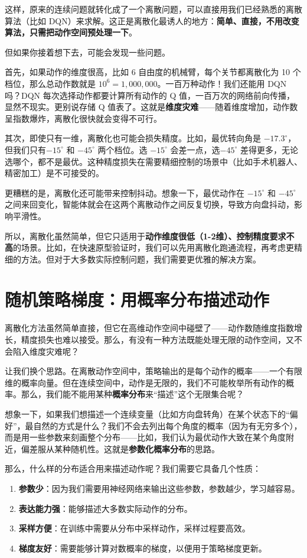 \documentclass[lang=cn,zihao=-4,a4paper,fontset=windows]{beautybook}
\begin{document}
这样，原来的连续问题就转化成了一个离散问题，可以直接用我们已经熟悉的离散算法（比如 DQN）来求解。这正是离散化最诱人的地方：\textbf{简单、直接，不用改变算法，只需把动作空间预处理一下}。

但如果你接着想下去，可能会发现一些问题。

首先，如果动作的维度很高，比如 6 自由度的机械臂，每个关节都离散化为 10 个档位，那么总动作数就是 \(10^6 = 1,000,000\)。一百万种动作！我们还能用 DQN 吗？DQN 每次选择动作都要计算所有动作的 Q 值，一百万次的网络前向传播，显然不现实。更别说存储 Q 值表了。这就是\textbf{维度灾难}——随着维度增加，动作数呈指数爆炸，离散化很快就会变得不可行。

其次，即使只有一维，离散化也可能会损失精度。比如，最优转向角是 $-17.3^\circ$，但我们只有$-15^\circ$ 和 $-45^\circ$ 两个档位。选 $-15^\circ$ 会差一点，选$ -45^\circ$ 差得更多，无论选哪个，都不是最优。这种精度损失在需要精细控制的场景中（比如手术机器人、精密加工）是不可接受的。

更糟糕的是，离散化还可能带来控制抖动。想象一下，最优动作在 $-15^\circ$ 和 $-45^\circ$ 之间来回变化，智能体就会在这两个离散动作之间反复切换，导致方向盘抖动，影响平滑性。

所以，离散化虽然简单，但它只适用于\textbf{动作维度很低（1-2维）、控制精度要求不高}的场景。比如，在快速原型验证时，我们可以先用离散化跑通流程，再考虑更精细的方法。但对于大多数实际控制问题，我们需要更优雅的解决方案。

\section{随机策略梯度：用概率分布描述动作}

离散化方法虽然简单直接，但它在高维动作空间中碰壁了——动作数随维度指数增长，精度损失也难以接受。那么，有没有一种方法既能处理无限的动作空间，又不会陷入维度灾难呢？

让我们换个思路。在离散动作空间中，策略输出的是每个动作的概率——一个有限维的概率向量。但在连续空间中，动作是无限的，我们不可能枚举所有动作的概率。那么，我们能不能用某种\textbf{概率分布}来“描述”这个无限集合呢？

想象一下，如果我们想描述一个连续变量（比如方向盘转角）在某个状态下的“偏好”，最自然的方式是什么？我们不会去列出每个角度的概率（因为有无穷多个），而是用一些参数来刻画整个分布——比如，我们认为最优动作大致在某个角度附近，偏差服从某种随机性。这就是\textbf{参数化概率分布}的思路。

那么，什么样的分布适合用来描述动作呢？我们需要它具备几个性质：
\begin{enumerate}
    \item \textbf{参数少}：因为我们需要用神经网络来输出这些参数，参数越少，学习越容易。
    \item \textbf{表达能力强}：能够描述大多数实际动作的分布。
    \item \textbf{采样方便}：在训练中需要从分布中采样动作，采样过程要高效。
    \item \textbf{梯度友好}：需要能够计算对数概率的梯度，以便用于策略梯度更新。
\end{enumerate}
\end{document}
